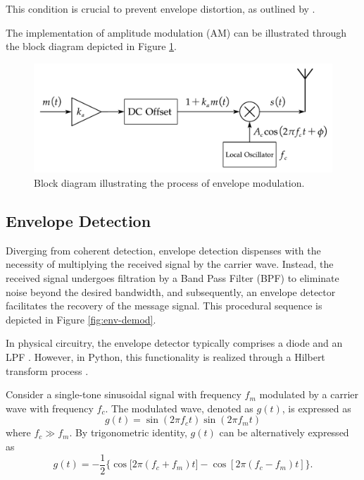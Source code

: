 \documentclass[../ECE459FinalProjectReport.tex]{subfiles}
\begin{document}
This condition is crucial to prevent envelope distortion, as outlined by \textcite[pp. 101-102]{haykinIntroductionAnalogDigital2007}.

The implementation of amplitude modulation (AM) can be illustrated through the block diagram depicted in Figure \ref{fig:env-mod}.
\begin{figure}[b]
    \centering
    \includegraphics[scale=0.6]{plots/env_mod.pdf}
    \caption{Block diagram illustrating the process of envelope modulation.}
    \label{fig:env-mod}
\end{figure}

\subsection{Envelope Detection}
Diverging from coherent detection, envelope detection dispenses with the necessity of multiplying the received signal by the carrier wave. Instead, the received signal undergoes filtration by a Band Pass Filter (BPF) to eliminate noise beyond the desired bandwidth, and subsequently, an envelope detector facilitates the recovery of the message signal. This procedural sequence is depicted in Figure \ref{fig:env-demod}.

In physical circuitry, the envelope detector typically comprises a diode and an LPF \cite{AnalogCommunicationAM}. However, in Python, this functionality is realized through a Hilbert transform process \cite{ulrichEnvelopeCalculationHilbert2006, XiXiaoShengPythonTiQuXinHaoDeBaoLuoGet2023}.

Consider a single-tone sinusoidal signal with frequency $f_m$ modulated by a carrier wave with frequency $f_c$. The modulated wave, denoted as $g(t)$, is expressed as
\begin{equation}
    g(t) = \sin(2\pi f_c t)\sin(2\pi f_m t)
\end{equation}
where $f_c\gg f_m$. By trigonometric identity, $g(t)$ can be alternatively expressed as
\begin{equation}
    g(t)=-\frac{1}{2}\{\cos\mathrm[2\pi (f_c+f_m)t]-\cos[2\pi (f_c-f_m)t]\}.
\end{equation}
\end{document}
